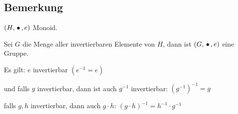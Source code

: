 \subsection{Bemerkung}
 
 $(H, \,{\bullet}\,, e)$ Monoid.
 
 Sei $G$ die Menge aller invertierbaren Elemente von $H$, dann ist $(G, \,{\bullet}\,, e)$ eine Gruppe.
 
 Es gilt: $e$ invertierbar $(e^{-1} = e)$
 
 und falls $g$ invertierbar, dann ist auch $g^{-1}$ invertierbar: $(g^{-1})^{-1} = g$
 
 falls $g, h$ invertierbar, dann auch $g \cdot h$: \quad
 $(g \cdot h)^{-1} = h^{-1} \cdot g^{-1} $
 
 
 
 
 
 
 